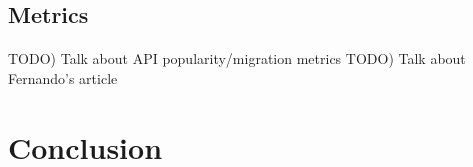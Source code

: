 \documentclass[12pt]{article}
\begin{document}



\subsection{Metrics}
\paragraph{}
TODO) Talk about API popularity/migration metrics
TODO) Talk about Fernando's article

\newpage 
\section{Conclusion}


\newpage


\end{document}
